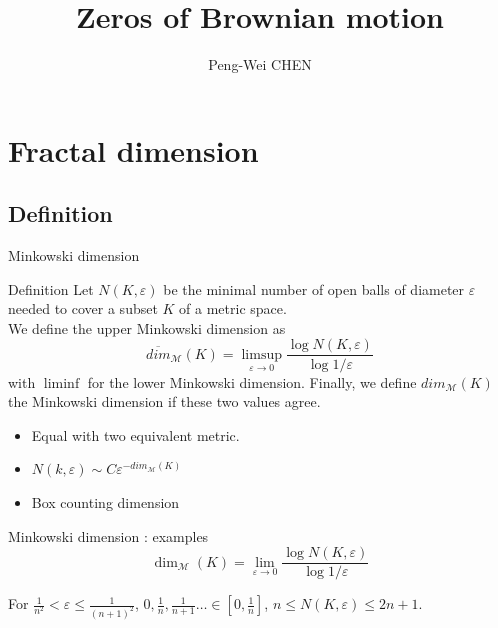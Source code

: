 \documentclass[t]{beamer}
\author{Peng-Wei CHEN}
\title{Zeros of Brownian motion}
\institute{MAP575 Foundations of probability and applications}
\begin{document}
\begin{frame}
    \titlepage
\end{frame}

\begin{frame}
    \tableofcontents
\end{frame}

\section{Fractal dimension}

\subsection{Definition}
\begin{frame}{Minkowski dimension}
    \begin{exampleblock}{Definition}
        Let $N(K, \varepsilon)$ be the minimal number of open balls of diameter $\varepsilon$ needed to cover a subset $K$ of a metric space.\\
        We define the upper Minkowski dimension as $$\overline{dim}_\mathcal{M}(K) = \limsup_{\varepsilon \to 0}\frac{\log N(K, \varepsilon)}{\log 1/\varepsilon}$$
        with $\liminf$ for the lower Minkowski dimension. Finally, we define $dim_\mathcal{M}(K)$ the Minkowski dimension if these two values agree.
        
    \end{exampleblock}
    \begin{itemize}
        \item Equal with two equivalent metric.
        \item{$N(k, \varepsilon) \sim C\varepsilon^{-dim_\mathcal{M}(K)}$}
        \item{Box counting dimension}
    \end{itemize}
\end{frame}

\begin{frame}{Minkowski dimension : examples}
    $$\dim_\mathcal{M}(K) = \lim_{\varepsilon \to 0}\frac{\log N(K, \varepsilon)}{\log 1/\varepsilon}$$
    For $\frac{1}{n^2} < \varepsilon \le \frac{1}{(n+1)^2}$, $0, \frac{1}{n}, \frac{1}{n+1}\dots \in [0, \frac{1}{n}]$, $n \le N(K, \varepsilon) \le 2n + 1$.


\end{frame}
\end{document}
